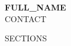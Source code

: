 \documentclass[11pt,a4paper]{article}
\begin{document}
\begin{center}
{\Huge\bfseries {{FULL_NAME}}}\\[6pt]
{\small {{CONTACT}}}
\end{center}
{{SECTIONS}}
\end{document}
